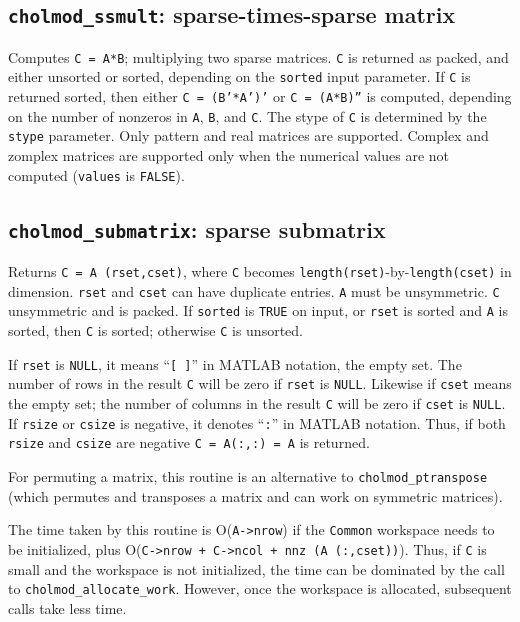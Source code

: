 \documentclass[11pt]{article}
\begin{document}
\subsection{{\tt cholmod\_ssmult}: sparse-times-sparse matrix}


Computes {\tt C = A*B}; multiplying two sparse matrices.
{\tt C} is returned as packed, and either unsorted or sorted, depending on the
{\tt sorted} input parameter.  If {\tt C} is returned sorted, then either {\tt C = (B'*A')'}
or {\tt C = (A*B)''} is computed, depending on the number of nonzeros in {\tt A}, {\tt B}, and {\tt C}.
The stype of {\tt C} is determined by the {\tt stype} parameter.
Only pattern and real matrices are supported.  Complex and zomplex matrices
are supported only when the numerical values are not computed ({\tt values}
is {\tt FALSE}).

\newpage \subsection{{\tt cholmod\_submatrix}: sparse submatrix}


Returns {\tt C = A (rset,cset)}, where {\tt C} becomes {\tt length(rset)}-by-{\tt length(cset)} in dimension.
{\tt rset} and {\tt cset} can have duplicate entries.  {\tt A} must be unsymmetric.  {\tt C} unsymmetric and
is packed.  If {\tt sorted} is {\tt TRUE} on input, or {\tt rset} is sorted and {\tt A} is
sorted, then {\tt C} is sorted; otherwise {\tt C} is unsorted.

If {\tt rset} is {\tt NULL}, it means ``{\tt [ ]}'' in MATLAB notation, the empty set.
The number of rows in the result {\tt C} will be zero if {\tt rset} is {\tt NULL}.
Likewise if {\tt cset} means the empty set; the number of columns in the result {\tt C} will be zero if {\tt cset} is {\tt NULL}.
If {\tt rsize} or {\tt csize} is negative, it denotes ``{\tt :}'' in MATLAB notation.
Thus, if both {\tt rsize} and {\tt csize} are negative {\tt C = A(:,:) = A} is returned.

For permuting a matrix, this routine is an alternative to {\tt cholmod\_ptranspose}
(which permutes and transposes a matrix and can work on symmetric matrices).

The time taken by this routine is O({\tt A->nrow}) if the {\tt Common} workspace needs
to be initialized, plus O({\tt C->nrow + C->ncol + nnz (A (:,cset))}).  Thus, if {\tt C}
is small and the workspace is not initialized, the time can be dominated by
the call to {\tt cholmod\_allocate\_work}.  However, once the workspace is
allocated, subsequent calls take less time.
\end{document}
